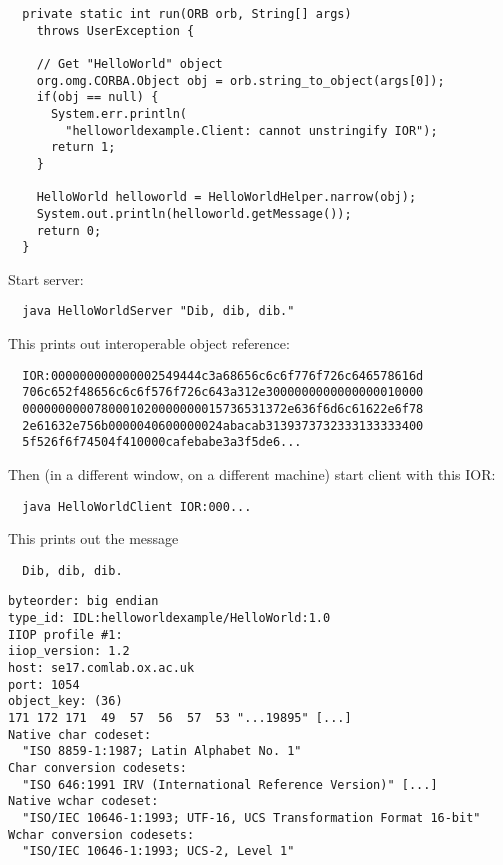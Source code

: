 \documentclass{sepslide-soa-faked} %
\begin{document}
\begin{slide}
\begin{verbatim}
  private static int run(ORB orb, String[] args)
    throws UserException {

    // Get "HelloWorld" object
    org.omg.CORBA.Object obj = orb.string_to_object(args[0]);
    if(obj == null) {
      System.err.println(
        "helloworldexample.Client: cannot unstringify IOR");
      return 1;
    }

    HelloWorld helloworld = HelloWorldHelper.narrow(obj);
    System.out.println(helloworld.getMessage());
    return 0;
  }
\end{verbatim}
\end{slide}

\begin{slide}
Start server:
\begin{verbatim}
  java HelloWorldServer "Dib, dib, dib."
\end{verbatim}
This prints out interoperable object reference:
\begin{verbatim}
  IOR:000000000000002549444c3a68656c6c6f776f726c646578616d
  706c652f48656c6c6f576f726c643a312e3000000000000000010000
  0000000000780001020000000015736531372e636f6d6c61622e6f78
  2e61632e756b0000040600000024abacab3139373732333133333400
  5f526f6f74504f410000cafebabe3a3f5de6...
\end{verbatim}
Then (in a different window, on a different machine) start client with this
IOR: 
\begin{verbatim}
  java HelloWorldClient IOR:000...
\end{verbatim}
This prints out the message
\begin{verbatim}
  Dib, dib, dib.
\end{verbatim}
\end{slide}

\begin{slide}
\begin{verbatim}
byteorder: big endian
type_id: IDL:helloworldexample/HelloWorld:1.0
IIOP profile #1:
iiop_version: 1.2
host: se17.comlab.ox.ac.uk
port: 1054
object_key: (36)
171 172 171  49  57  56  57  53 "...19895" [...]
Native char codeset: 
  "ISO 8859-1:1987; Latin Alphabet No. 1"
Char conversion codesets:
  "ISO 646:1991 IRV (International Reference Version)" [...]
Native wchar codeset: 
  "ISO/IEC 10646-1:1993; UTF-16, UCS Transformation Format 16-bit"
Wchar conversion codesets:
  "ISO/IEC 10646-1:1993; UCS-2, Level 1"
\end{verbatim}
\end{slide}
\end{document}
